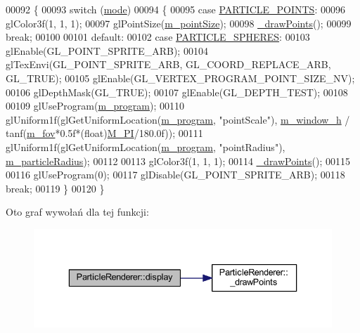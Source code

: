 \begin{DoxyCode}
00092 \{
00093     \textcolor{keywordflow}{switch} (\hyperlink{particles_8cpp_a1ea5d0cb93f22f7d0fdf804bd68c3326}{mode})
00094     \{
00095         \textcolor{keywordflow}{case} \hyperlink{class_particle_renderer_a7b691afffd1abe415cb0ce17fd26f3d5a76d84afc3ec5c09bff035fe798dacbbe}{PARTICLE\_POINTS}:
00096             glColor3f(1, 1, 1);
00097             glPointSize(\hyperlink{class_particle_renderer_a1ca13e546c937cb546c0da19fa853b34}{m\_pointSize});
00098             \hyperlink{class_particle_renderer_a2683c43c010bff7973a977c1953f2bd6}{\_drawPoints}();
00099             \textcolor{keywordflow}{break};
00100 
00101         \textcolor{keywordflow}{default}:
00102         \textcolor{keywordflow}{case} \hyperlink{class_particle_renderer_a7b691afffd1abe415cb0ce17fd26f3d5acc641adfb37c1a267e9f91d128094111}{PARTICLE\_SPHERES}:
00103             glEnable(GL\_POINT\_SPRITE\_ARB);
00104             glTexEnvi(GL\_POINT\_SPRITE\_ARB, GL\_COORD\_REPLACE\_ARB, GL\_TRUE);
00105             glEnable(GL\_VERTEX\_PROGRAM\_POINT\_SIZE\_NV);
00106             glDepthMask(GL\_TRUE);
00107             glEnable(GL\_DEPTH\_TEST);
00108 
00109             glUseProgram(\hyperlink{class_particle_renderer_ab8f0dd1a6e0f4401012bd46ae8940648}{m\_program});
00110             glUniform1f(glGetUniformLocation(\hyperlink{class_particle_renderer_ab8f0dd1a6e0f4401012bd46ae8940648}{m\_program}, \textcolor{stringliteral}{"pointScale"}), 
      \hyperlink{class_particle_renderer_af34b1e93f6a7f22774a6473c52027d77}{m\_window\_h} / tanf(\hyperlink{class_particle_renderer_a0aed003bd557a3c32ca7d2ca89fc59f7}{m\_fov}*0.5f*(\textcolor{keywordtype}{float})\hyperlink{render__particles_8cpp_ae71449b1cc6e6250b91f539153a7a0d3}{M\_PI}/180.0f));
00111             glUniform1f(glGetUniformLocation(\hyperlink{class_particle_renderer_ab8f0dd1a6e0f4401012bd46ae8940648}{m\_program}, \textcolor{stringliteral}{"pointRadius"}), 
      \hyperlink{class_particle_renderer_aab5ee3cd769a64c45dc9714aabdb0ee2}{m\_particleRadius});
00112 
00113             glColor3f(1, 1, 1);
00114             \hyperlink{class_particle_renderer_a2683c43c010bff7973a977c1953f2bd6}{\_drawPoints}();
00115 
00116             glUseProgram(0);
00117             glDisable(GL\_POINT\_SPRITE\_ARB);
00118             \textcolor{keywordflow}{break};
00119     \}
00120 \}
\end{DoxyCode}


Oto graf wywołań dla tej funkcji\-:\nopagebreak
\begin{figure}[H]
\begin{center}
\leavevmode
\includegraphics[width=336pt]{class_particle_renderer_a80b2f52dc28bb3abbde021f7fe96f8ff_cgraph}
\end{center}
\end{figure}




